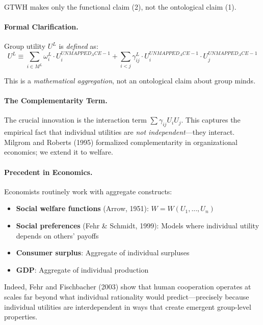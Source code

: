 GTWH makes only the functional claim (2), not the ontological claim (1).

\paragraph{Formal Clarification.}

Group utility $U^L$ is \textit{defined} as:
\begin{equation}
U^L \equiv \sum_{i \in M^L} \omega^L_i \cdot U^{UNMAPPED_ACE-1}_i + \sum_{i < j} \gamma^L_{ij} \cdot U^{UNMAPPED_ACE-1}_i \cdot U^{UNMAPPED_ACE-1}_j
\end{equation}

This is a \textit{mathematical aggregation}, not an ontological claim about group minds.

\paragraph{The Complementarity Term.}

The crucial innovation is the interaction term $\sum \gamma_{ij} U_i U_j$. 
This captures the empirical fact that individual utilities are \textit{not 
independent}---they interact. Milgrom and Roberts (1995) formalized complementarity 
in organizational economics; we extend it to welfare.

\paragraph{Precedent in Economics.}

Economists routinely work with aggregate constructs:
\begin{itemize}[nosep]
\item \textbf{Social welfare functions} (Arrow, 1951): $W = W(U_1, ..., U_n)$
\item \textbf{Social preferences} (Fehr \& Schmidt, 1999): Models where individual 
utility depends on others' payoffs
\item \textbf{Consumer surplus}: Aggregate of individual surpluses
\item \textbf{GDP}: Aggregate of individual production
\end{itemize}

Indeed, Fehr and Fischbacher (2003) show that human cooperation operates at 
scales far beyond what individual rationality would predict---precisely because 
individual utilities are interdependent in ways that create emergent group-level 
properties.

